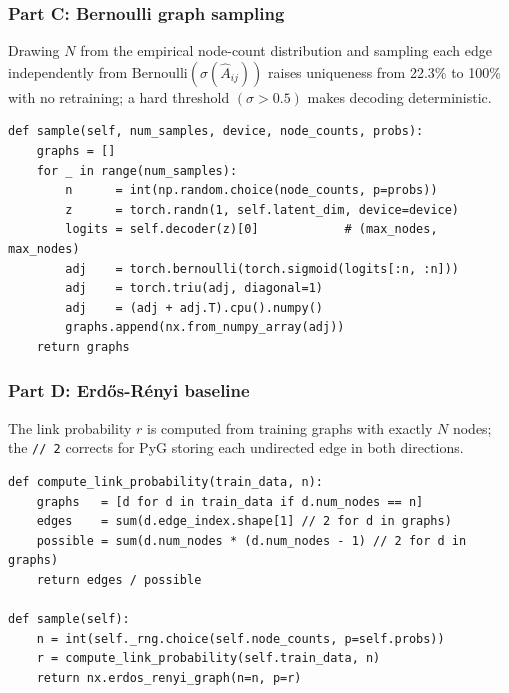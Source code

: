 \subsubsection*{Part C: Bernoulli graph sampling}
Drawing $N$ from the empirical node-count distribution and sampling each edge independently from
$\mathrm{Bernoulli}(\sigma(\hat{A}_{ij}))$ raises uniqueness from 22.3\% to 100\% with no
retraining; a hard threshold $(\sigma > 0.5)$ makes decoding deterministic.
\begin{lstlisting}
def sample(self, num_samples, device, node_counts, probs):
    graphs = []
    for _ in range(num_samples):
        n      = int(np.random.choice(node_counts, p=probs))
        z      = torch.randn(1, self.latent_dim, device=device)
        logits = self.decoder(z)[0]            # (max_nodes, max_nodes)
        adj    = torch.bernoulli(torch.sigmoid(logits[:n, :n]))
        adj    = torch.triu(adj, diagonal=1)
        adj    = (adj + adj.T).cpu().numpy()
        graphs.append(nx.from_numpy_array(adj))
    return graphs
\end{lstlisting}

\subsubsection*{Part D: Erdős-Rényi baseline}
The link probability $r$ is computed from training graphs with exactly $N$ nodes; the
\texttt{//\,2} corrects for PyG storing each undirected edge in both directions.
\begin{lstlisting}
def compute_link_probability(train_data, n):
    graphs   = [d for d in train_data if d.num_nodes == n]
    edges    = sum(d.edge_index.shape[1] // 2 for d in graphs)
    possible = sum(d.num_nodes * (d.num_nodes - 1) // 2 for d in graphs)
    return edges / possible

def sample(self):
    n = int(self._rng.choice(self.node_counts, p=self.probs))
    r = compute_link_probability(self.train_data, n)
    return nx.erdos_renyi_graph(n=n, p=r)
\end{lstlisting}
